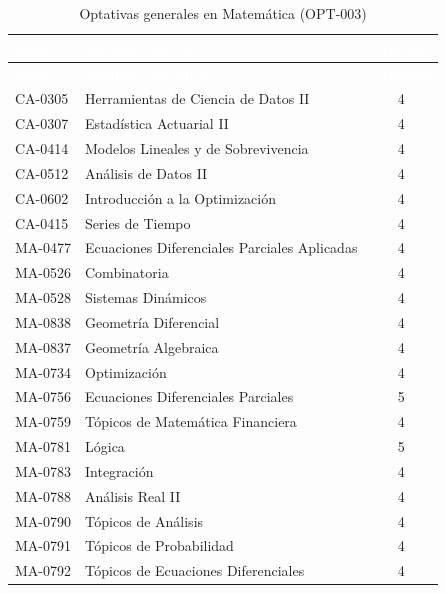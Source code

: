\begingroup
\small
{}%
\renewcommand{\arraystretch}{1.2}%
%
\begin{longtable}{|l|>{\raggedright\arraybackslash}p{9.4cm}|c|}
\caption{Optativas generales en Matemática (OPT-003)}\label{res:opt003}\\
\hline
\rowcolor{Azul-UCR}
\textcolor{white}{\textbf{Sigla}} & \textcolor{white}{\textbf{Nombre del curso}} & \textcolor{white}{\textbf{Créditos}} \\ \hline
\endfirsthead
\hline
\rowcolor{Azul-UCR}
\textcolor{white}{\textbf{Sigla}} & \textcolor{white}{\textbf{Nombre del curso}} & \textcolor{white}{\textbf{Créditos}} \\ \hline
\endhead
\hline
\endfoot
CA-0305 & Herramientas de Ciencia de Datos II & 4 \\ \hline
CA-0307 & Estadística Actuarial II & 4 \\ \hline
CA-0414 & Modelos Lineales y de Sobrevivencia & 4 \\ \hline
CA-0512 & Análisis de Datos II & 4 \\ \hline
CA-0602 & Introducción a la Optimización & 4 \\ \hline
CA-0415 & Series de Tiempo & 4 \\ \hline
MA-0477 & Ecuaciones Diferenciales Parciales Aplicadas & 4 \\ \hline
MA-0526 & Combinatoria & 4 \\ \hline
MA-0528 & Sistemas Dinámicos & 4 \\ \hline
MA-0838 & Geometría Diferencial & 4 \\ \hline
MA-0837 & Geometría Algebraica & 4 \\ \hline
MA-0734 & Optimización & 4 \\ \hline
MA-0756 & Ecuaciones Diferenciales Parciales & 5 \\ \hline
MA-0759 & Tópicos de Matemática Financiera & 4 \\ \hline
MA-0781 & Lógica & 5 \\ \hline
MA-0783 & Integración & 4 \\ \hline
MA-0788 & Análisis Real II & 4 \\ \hline
MA-0790 & Tópicos de Análisis & 4 \\ \hline
MA-0791 & Tópicos de Probabilidad & 4 \\ \hline
MA-0792 & Tópicos de Ecuaciones Diferenciales & 4 \\ \hline

\end{longtable}

